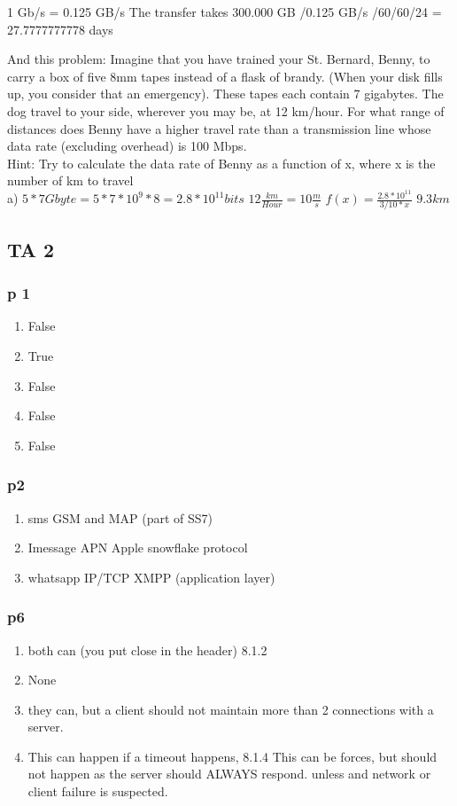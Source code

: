 \documentclass[a4paper,10pt,titlepage]{report}
\begin{document}
1 Gb/s = 0.125 GB/s
The transfer takes 300.000 GB /0.125 GB/s /60/60/24 = 27.7777777778 days
\\
\vspace{10mm}

And this problem: Imagine that you have trained your St. Bernard, Benny, to carry a box of five 8mm tapes instead of a flask of brandy. (When your disk fills up, you consider that an emergency). These tapes each contain 7 gigabytes. The dog travel to your side, wherever you may be, at 12 km/hour. For what range of distances does Benny have a higher travel rate than a transmission line whose data rate (excluding overhead) is 100 Mbps. \\
Hint: Try to calculate the data rate of Benny as a function of x, where x is the number of km to travel \\

a) $5*7 Gbyte = 5* 7 *10^9 * 8 = 2.8 *10^11 bits$
	$12 \frac{km}{Hour} = 10 \frac{m}{s}$
	$f(x) = \frac{2.8 * 10^11}{3/10*x}$
	$9.3 km$
\subsection{TA 2}

\subsubsection{p 1}
\begin{enumerate}[label=(\alph*)]
\item False
\item True
\item False
\item False
\item False
\end{enumerate}
\subsubsection{p2}
\begin{enumerate}[label=(\alph*)]
\item sms GSM and MAP (part of SS7)
\item Imessage APN Apple snowflake protocol
\item whatsapp IP/TCP XMPP (application layer)
\end{enumerate}

	
\subsubsection{p6}
\begin{enumerate}[label=(\alph*)]
\item both can (you put close in the header) 8.1.2
\item None 
\item they can, but a client should not maintain more than 2 connections with a server.
\item This can happen if a timeout happens, 8.1.4 
This can be forces, but should not happen as the server should ALWAYS respond. unless and network or client failure is suspected.

\end{enumerate}
\end{document}
